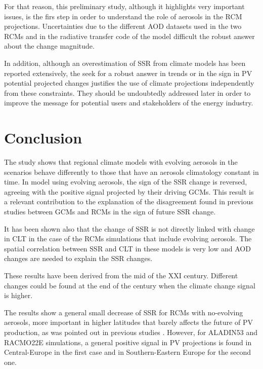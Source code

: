 For that reason, this preliminary study, although it highlights very important issues, is the firs step in order to understand the role of aerosols in the RCM projections. Uncertainties due to the different AOD datasets used in the two RCMs and in the radiative transfer code of the model difficult the robust answer about the change magnitude. 

In addition, although an overestimation of SSR from climate models has been reported extensively, the seek for a robust answer in trends or in the sign in PV potential projected changes justifies the use of climate projections independently from these constraints. They should be undoubtedly addressed later in order to improve the message for potential users and stakeholders of the energy industry.

\section{Conclusion}

The study shows that regional climate models with evolving aerosols in the scenarios behave differently to those that have an aerosols climatology constant in time. In model using evolving aerosols, the sign of the SSR change is reversed, agreeing with the positive signal projected by their driving GCMs. This result is a relevant contribution to the explanation of the disagreement found in previous studies between GCMs and RCMs in the sign of future SSR change.

It has been shown also that the change of SSR is not directly linked with change in CLT in the case of the RCMs simulations that include evolving aerosols. The spatial correlation between SSR and CLT in these models is very low and AOD changes are needed to explain the SSR changes.

These results have been derived from the mid of the XXI century. Different changes could be found at the end of the century when the climate change signal is higher.

The results show a general small decrease of SSR for RCMs with no-evolving aerosols, more important in higher latitudes that barely affects the future of PV production, as was pointed out in previous studies \cite*{Jerez2015, Jerez2019}. However, for ALADIN53 and RACMO22E simulations, a general positive signal in PV projections is found in Central-Europe in the first case and in Southern-Eastern Europe for the second one.

